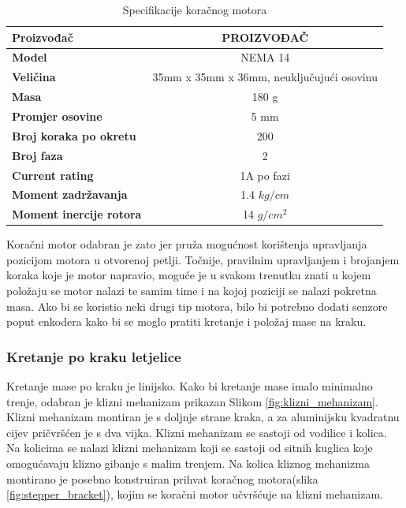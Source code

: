 \documentclass[11pt,a4paper]{article}
\begin{document}
\begin{table}[H]
	\centering
	\caption{Specifikacije koračnog motora }
	\label{tab:specifikacija_steppera}
	\begin{tabular}{|l|c|}
		\hline
		\textbf{Proizvođač} &PROIZVOĐAČ \\ \hline 
		\textbf{Model} & NEMA 14  \\ \hline 
		\textbf{Veličina} & 35mm x 35mm x 36mm, neuključujući osovinu  \\ \hline 
		\textbf{Masa} & 180 g  \\ \hline 
		\textbf{Promjer osovine} & 5 mm \\ \hline 
		\textbf{Broj koraka po okretu} & 200 \\ \hline 
		\textbf{Broj faza} & 2 \\ \hline 
		\textbf{Current rating} & 1A po fazi \\ \hline 
		\textbf{Moment zadržavanja} & 1.4 $kg/cm$ \\ \hline 
		\textbf{Moment inercije rotora} & 14 $g/cm^2$ \\ \hline 
	\end{tabular}
\end{table}

Koračni motor odabran je zato jer pruža mogućnost korištenja upravljanja pozicijom motora u otvorenoj petlji. Točnije, pravilnim upravljanjem i brojanjem koraka koje je motor napravio, moguće je u svakom trenutku znati u kojem položaju se motor nalazi te samim time i na kojoj poziciji se nalazi pokretna masa. Ako bi se koristio neki drugi tip motora, bilo bi potrebno dodati senzore poput enkodera kako bi se moglo pratiti kretanje i položaj mase na kraku.




\subsubsection{Kretanje po kraku letjelice}

Kretanje mase po kraku je linijsko. Kako bi kretanje mase imalo minimalno trenje, odabran je klizni mehanizam prikazan Slikom \ref{fig:klizni_mehanizam}. Klizni mehanizam montiran je s doljnje strane kraka, a za aluminijsku kvadratnu cijev pričvršćen je s dva vijka. Klizni mehanizam se sastoji od vodilice i kolica. Na kolicima se nalazi klizni mehanizam koji se sastoji od sitnih kuglica koje omogućavaju klizno gibanje s malim trenjem. Na kolica kliznog mehanizma montirano je posebno konstruiran prihvat koračnog motora(slika \ref{fig:stepper_bracket}), kojim se koračni motor učvršćuje na klizni mehanizam.
\end{document}
